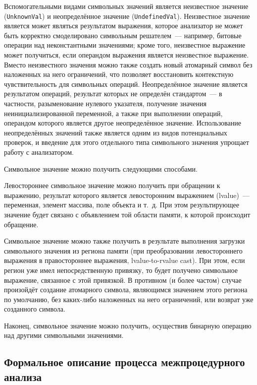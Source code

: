 Вспомогательными видами символьных значений является неизвестное значение (\texttt{UnknownVal}) и неопределённое значение (\texttt{UndefinedVal}). Неизвестное значение является может являться результатом выражения, которое анализатор не может быть корректно смоделировано символьным решателем~--- например, битовые операции над неконстантными значениями; кроме того, неизвестное выражение может получиться, если операндом выражения является неизвестное выражение. Вместо неизвестного значения можно также создать новый атомарный символ без наложенных на него ограничений, что позволяет восстановить контекстную чувствительность для символьных операций. Неопределённое значение является результатом операций, результат которых не определён стандартом~--- в частности, разыменование нулевого указателя, получение значения неинициализированной переменной, а также при выполнении операций, операндом которого является другое неопределённое значение. Использование неопределённых значений также является одним из видов потенциальных проверок, и введение для этого отдельного типа символьного значения упрощает работу с анализатором.

Символьное значение можно получить следующими способами.

Левостороннее символьное значение можно получить при обращении к выражению, результат которого является левосторонним выражением (lvalue)~--- переменная, элемент массива, поле объекта и т.~д. При этом результирующее значение будет связано с объявлением той области памяти, к которой происходит обращение.

Символьное значение можно также получить в результате выполнения загрузки символьного значения из региона памяти (при преобразовании левостороннего выражения в правостороннее выражения, lvalue-to-rvalue cast). При этом, если регион уже имел непосредственную привязку, то будет получено символьное выражение, связанное с этой привязкой. В противном (и более частом) случае произойдёт создание атомарного символа, являющимся значением этого региона по умолчанию, без каких-либо наложенных на него ограничений, или возврат уже созданного символа.

Наконец, символьное значение можно получить, осуществив бинарную операцию над другими символьными значениями.

\subsection{Формальное описание процесса межпроцедурного анализа}

